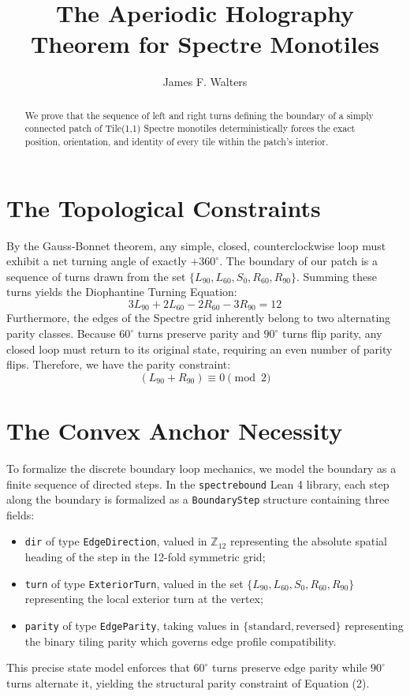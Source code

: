 \documentclass[11pt, a4paper]{amsart}
\title{The Aperiodic Holography Theorem for Spectre Monotiles}
\author{James F. Walters}
\begin{document}
\begin{abstract}
We prove that the sequence of left and right turns defining the boundary of a simply connected patch of Tile(1,1) Spectre monotiles deterministically forces the exact position, orientation, and identity of every tile within the patch's interior.
\end{abstract}

\maketitle

\section{The Topological Constraints}
By the Gauss-Bonnet theorem, any simple, closed, counterclockwise loop must exhibit a net turning angle of exactly $+360^\circ$. The boundary of our patch is a sequence of turns drawn from the set $\{L_{90}, L_{60}, S_{0}, R_{60}, R_{90}\}$. Summing these turns yields the Diophantine Turning Equation:
\begin{equation}
3L_{90} + 2L_{60} - 2R_{60} - 3R_{90} = 12
\end{equation}
Furthermore, the edges of the Spectre grid inherently belong to two alternating parity classes. Because $60^\circ$ turns preserve parity and $90^\circ$ turns flip parity, any closed loop must return to its original state, requiring an even number of parity flips. Therefore, we have the parity constraint:
\begin{equation}
(L_{90} + R_{90}) \equiv 0 \pmod 2
\end{equation}

\section{The Convex Anchor Necessity}
To formalize the discrete boundary loop mechanics, we model the boundary as a finite sequence of directed steps. In the \texttt{spectrebound} Lean 4 library, each step along the boundary is formalized as a \texttt{BoundaryStep} structure containing three fields:
\begin{itemize}
    \item \texttt{dir} of type \texttt{EdgeDirection}, valued in $\mathbb{Z}_{12}$ representing the absolute spatial heading of the step in the 12-fold symmetric grid;
    \item \texttt{turn} of type \texttt{ExteriorTurn}, valued in the set $\{L_{90}, L_{60}, S_{0}, R_{60}, R_{90}\}$ representing the local exterior turn at the vertex;
    \item \texttt{parity} of type \texttt{EdgeParity}, taking values in $\{\text{standard}, \text{reversed}\}$ representing the binary tiling parity which governs edge profile compatibility.
\end{itemize}
This precise state model enforces that $60^\circ$ turns preserve edge parity while $90^\circ$ turns alternate it, yielding the structural parity constraint of Equation (2).
\end{document}
